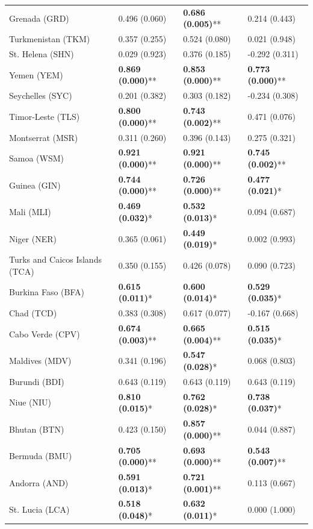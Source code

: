 \begin{longtable}{p{4cm}p{3cm}p{3cm}p{3cm}}
Grenada (GRD) & 0.496 (0.060) & \textbf{0.686 (0.005)}** & 0.214 (0.443) \\
Turkmenistan (TKM) & 0.357 (0.255) & 0.524 (0.080) & 0.021 (0.948) \\
St. Helena (SHN) & 0.029 (0.923) & 0.376 (0.185) & -0.292 (0.311) \\
Yemen (YEM) & \textbf{0.869 (0.000)}** & \textbf{0.853 (0.000)}** & \textbf{0.773 (0.000)}** \\
Seychelles (SYC) & 0.201 (0.382) & 0.303 (0.182) & -0.234 (0.308) \\
Timor-Leste (TLS) & \textbf{0.800 (0.000)}** & \textbf{0.743 (0.002)}** & 0.471 (0.076) \\
Montserrat (MSR) & 0.311 (0.260) & 0.396 (0.143) & 0.275 (0.321) \\
Samoa (WSM) & \textbf{0.921 (0.000)}** & \textbf{0.921 (0.000)}** & \textbf{0.745 (0.002)}** \\
Guinea (GIN) & \textbf{0.744 (0.000)}** & \textbf{0.726 (0.000)}** & \textbf{0.477 (0.021)}* \\
Mali (MLI) & \textbf{0.469 (0.032)}* & \textbf{0.532 (0.013)}* & 0.094 (0.687) \\
Niger (NER) & 0.365 (0.061) & \textbf{0.449 (0.019)}* & 0.002 (0.993) \\
Turks and Caicos Islands (TCA) & 0.350 (0.155) & 0.426 (0.078) & 0.090 (0.723) \\
Burkina Faso (BFA) & \textbf{0.615 (0.011)}* & \textbf{0.600 (0.014)}* & \textbf{0.529 (0.035)}* \\
Chad (TCD) & 0.383 (0.308) & 0.617 (0.077) & -0.167 (0.668) \\
Cabo Verde (CPV) & \textbf{0.674 (0.003)}** & \textbf{0.665 (0.004)}** & \textbf{0.515 (0.035)}* \\
Maldives (MDV) & 0.341 (0.196) & \textbf{0.547 (0.028)}* & 0.068 (0.803) \\
Burundi (BDI) & 0.643 (0.119) & 0.643 (0.119) & 0.643 (0.119) \\
Niue (NIU) & \textbf{0.810 (0.015)}* & \textbf{0.762 (0.028)}* & \textbf{0.738 (0.037)}* \\
Bhutan (BTN) & 0.423 (0.150) & \textbf{0.857 (0.000)}** & 0.044 (0.887) \\
Bermuda (BMU) & \textbf{0.705 (0.000)}** & \textbf{0.693 (0.000)}** & \textbf{0.543 (0.007)}** \\
Andorra (AND) & \textbf{0.591 (0.013)}* & \textbf{0.721 (0.001)}** & 0.113 (0.667) \\
St. Lucia (LCA) & \textbf{0.518 (0.048)}* & \textbf{0.632 (0.011)}* & 0.000 (1.000) \\

\end{longtable}

